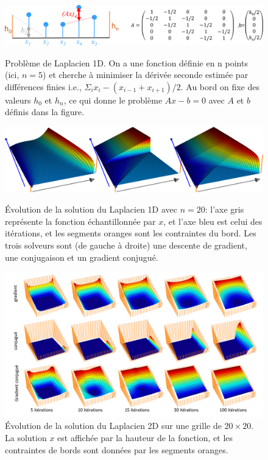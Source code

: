 \documentclass[notitlepage,oneside]{book}
\begin{document}
\begin{figure}[p]
  \centering
  \includegraphics[width=1\linewidth]{cg/laplace1d.png}
  \caption{Problème de Laplacien 1D. On a une fonction définie en n
    points (ici, $n=5$) et cherche à minimiser la dérivée seconde
    estimée par différences finies i.e., $\Sigma_i
    x_i-(x_{i-1}+x_{i+1})/2$. Au bord on fixe des valeurs $h_0$ et
    $h_n$, ce qui donne le problème $Ax-b=0$ avec $A$ et $b$ définis
    dans la figure.}
  \label{fig:laplace1d}
  \vspace{5mm}

  \includegraphics[width=1\linewidth]{cg/laplace1dresults.png}
  \caption{Évolution de la solution du Laplacien 1D avec $n=20$: l'axe
    gris représente la fonction échantillonnée par $x$, et l'axe bleu
    est celui des itérations, et les segments oranges sont les
    contraintes du bord. Les trois solveurs sont (de gauche à droite)
    une descente de gradient, une conjugaison et un gradient
    conjugué.}
  \label{fig:laplace1dresults}
  \vspace{5mm}

  \includegraphics[width=1\linewidth]{cg/laplace2d.png}
  \caption{Évolution de la solution du Laplacien 2D sur une grille de
    $20 \times 20$. La solution $x$ est affichée par la hauteur de la
    fonction, et les contraintes de bords sont données par les
    segments oranges.}
  \label{fig:laplace2d}
\end{figure}
\end{document}
